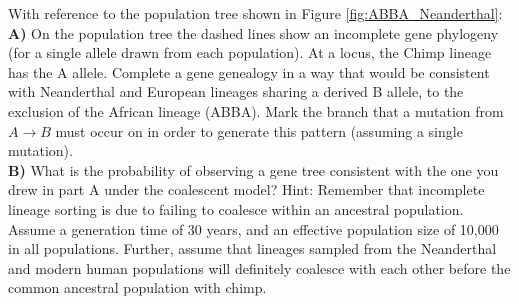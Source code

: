 \begin{question}{}
With reference to the population tree shown in Figure \ref{fig:ABBA_Neanderthal}:
{\bf A)} On the population tree the dashed lines show an
incomplete gene phylogeny (for a single allele drawn from each population). At a locus, the Chimp lineage has the A allele. Complete
a gene genealogy in a way that would be consistent with Neanderthal and European lineages sharing a derived B allele, to the
exclusion of the African lineage (ABBA). Mark the branch that a mutation from $A
\rightarrow B$  must occur on in order to generate this pattern
(assuming a single mutation).\\
{\bf B)} What is the probability of observing a gene tree consistent
with the one you drew in part A under the coalescent model? Hint:
Remember that incomplete lineage sorting is due to failing to coalesce
within an ancestral population. \\
Assume a generation time of 30 years, and an
effective population size of 10,000 in all populations. Further, assume that lineages
sampled from the
Neanderthal and modern human populations will definitely coalesce with
each other before the common ancestral population with chimp.
\end{question}


